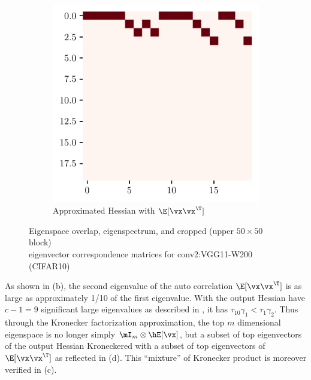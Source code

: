 \begin{figure}[H]
\begin{subfigure}[b]{0.24\textwidth}
        \includegraphics[width=\textwidth]{Appendix_Figures/Overlap_large_model/FailExplanation/VGGearly/xxT_Approxest_real_corr_expand_t20_CIFAR10_Exp1_VGG11W200_fxlr0.01_E-1_features.11.pdf}
        \caption{Approximated Hessian with $\E[\vx\vx^\T]$}
        \label{fig:app_adexp_vgg_corr_est}
    \end{subfigure}
    \captionsetup{justification=centering}
    \caption{Eigenspace overlap, eigenspectrum, and cropped (upper $50\times 50$ block)\\eigenvector correspondence matrices for conv2:VGG11-W200 (CIFAR10)}
    \vspace{-0.1in}
    \label{fig:app_adexp_vgg_fail}
\end{figure}

As shown in (b), the second eigenvalue of the auto correlation $\E[\vx\vx^\T]$ is as large as approximately 1/10 of the first eigenvalue.
With the output Hessian have $c-1=9$ significant large eigenvalues as described in \label{sec:emp_outlier}, it has $\tau_{10}\gamma_1 < \tau_1\gamma_2$.
Thus through the Kronecker factorization approximation, the top $m$ dimensional eigenspace is no longer simply $\mI_m\otimes \hE[\vx]$, but a subset of top eigenvectors of the output Hessian Kroneckered with a subset of top eigenvectors of $\E[\vx\vx^\T]$ as reflected in (d). This ``mixture'' of Kronecker product is moreover verified in (c).

